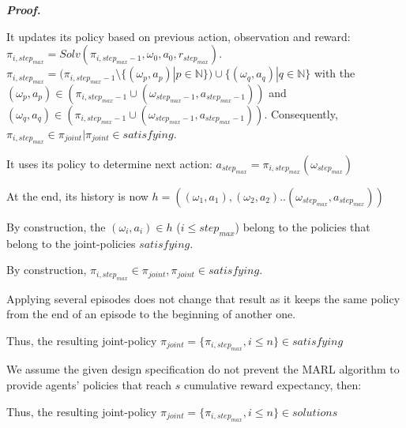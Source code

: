 \documentclass{ecai}
\newcounter{proof}
\renewcommand{\theproof}{\arabic{proof}}
\renewenvironment{proof}[1][]{
    \refstepcounter{proof}
    \noindent \raggedright \textit{\textbf{Proof. \theproof}}

    \setlength{\leftskip}{1em}

}
{

\
\setlength{\leftskip}{0pt}
}
\begin{document}
\begin{proof}
    It updates its policy based on previous action, observation and reward: $\pi_{i,step_{max}} = Solv(\pi_{i,step_{max}-1}, \omega_0, a_0, r_{step_{max}})$.
    $\pi_{i,step_{max}} = (\pi_{i,step_{max}-1} \setminus \{(\omega_p, a_p) | p \in \mathbb{N}\}) \cup \{(\omega_q, a_q) | q \in \mathbb{N}\}$ with the $(\omega_p, a_p) \in (\pi_{i,step_{max}-1} \cup {(\omega_{step_{max}-1}, a_{step_{max}-1})})$ and $(\omega_q, a_q) \in (\pi_{i,step_{max}-1} \cup {(\omega_{step_{max}-1}, a_{step_{max}-1})})$. Consequently, $\pi_{i,step_{max}} \in \pi_{joint} | \pi_{joint} \in satisfying$.

    It uses its policy to determine next action: $a_{step_{max}} = \pi_{i,step_{max}}(\omega_{step_{max}})$

    At the end, its history is now $h = ((\omega_1, a_1), (\omega_2, a_2)..(\omega_{step_{max}}, a_{step_{max}}))$

    By construction, the $(\omega_i,a_i) \in h$ ($i \leq step_{max}$) belong to the policies that belong to the joint-policies $satisfying$.
    
    By construction, $\pi_{i,step_{max}} \in \pi_{joint}, \pi_{joint} \in satisfying$.

    Applying several episodes does not change that result as it keeps the same policy from the end of an episode to the beginning of another one.

    Thus, the resulting joint-policy $\pi_{joint} = \{\pi_{i,step_{max}}, i \leq n\} \in satisfying$

    We assume the given design specification do not prevent the MARL algorithm to provide agents' policies that reach $s$ cumulative reward expectancy, then:

    Thus, the resulting joint-policy $\pi_{joint} = \{\pi_{i,step_{max}}, i \leq n\} \in solutions$

\end{proof}
\end{document}
